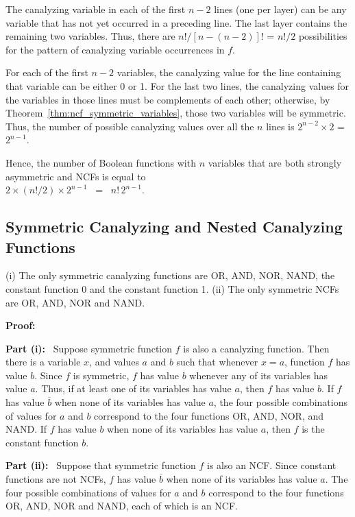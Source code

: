The canalyzing variable in each of the first $n-2$ lines (one per
layer) can be any variable that has not yet occurred in a preceding
line.  The last layer contains the remaining two variables.  Thus,
there are $n! /[n-(n-2)]!$ = $n!/2$ possibilities for the pattern of 
canalyzing variable occurrences in $f$.

For each of the first $n-2$ variables, the canalyzing value for the line
containing that variable can be either 0 or 1.  
For the last two lines, the canalyzing values for the variables 
in those lines must be complements of each other; otherwise, by 
Theorem~\ref{thm:ncf_symmetric_variables}, those two variables 
will be symmetric.
Thus, the number of possible canalyzing values over all the $n$
lines is $2^{n-2} \times 2$ = $2^{n-1}$.

Hence, the number of Boolean functions with $n$ variables that
are both strongly asymmetric and NCFs is equal to \\ 
$2 \times (n!/2) \times 2^{n-1}$ ~=~ $n!\,2^{n-1}$.  \QED


\subsection{Symmetric Canalyzing and Nested Canalyzing Functions}
\label{sse:sym_and_cf_ncf}

\begin{proposition}\label{pro:ncf_symmetric}
(i) The only symmetric canalyzing functions are OR, AND, NOR, NAND, 
the constant function 0 and the constant function 1.
(ii) The only symmetric NCFs are OR, AND, NOR and NAND.
\end{proposition}
\noindent
\textbf{Proof:}~

\smallskip

\noindent
\textbf{Part (i):}~
Suppose symmetric function $f$ is also a canalyzing function. 
Then there is a variable $x$, and values $a$ and $b$ 
such that whenever $x = a$, function $f$ has value $b$.  
Since $f$ is symmetric, $f$  has
value $b$ whenever any of its variables has value $a$.  
Thus, if at least one of its variables has value $a$, then $f$ has value $b$.  
If $f$ has value $\overline{b}$ when none of its variables has
value $a$, the four possible combinations of values for $a$ and $b$
correspond to the four functions OR, AND, NOR, and NAND.  If $f$
has value $b$ when none of its variables has value $a$, then $f$
is the constant function $b$.

\smallskip

\noindent
\textbf{Part (ii):}~
Suppose that symmetric function $f$ is also an NCF.  
Since constant functions are not NCFs,
$f$ has value $\overline{b}$ when none of its variables has value $a$.
The four possible combinations of values for $a$ and $b$ correspond
to the four functions OR, AND, NOR and NAND, each of which is an
NCF.  \QED








